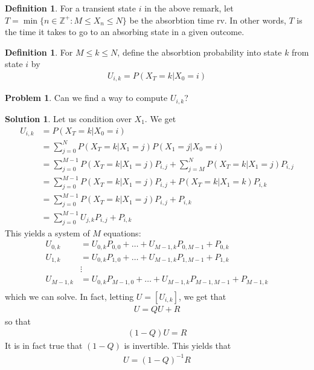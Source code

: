 \documentclass[11pt]{amsart}
\theoremstyle{definition}
\newtheorem{definition}[theorem]{Definition}
\newtheorem{problem}[theorem]{Problem}
\newtheorem{solution}[theorem]{Solution}
\numberwithin{equation}{section}
\begin{document}
 \begin{definition}
     For a transient state $i$ in the above remark, let $T=\min\{n\in\mathbb Z^+:M\le X_n\le N\}$ be the absorbtion time rv. In other words, $T$ is the time it takes to go to an absorbing state in a given outcome.
 \end{definition}
 \begin{definition}
     For $M\le k\le N$, define the absorbtion probability into state $k$ from state $i$ by
     \begin{align*}
         U_{i,k}=P(X_T=k|X_0=i)
     \end{align*}
 \end{definition}
 \begin{problem}
     Can we find a way to compute $U_{i,k}$?
 \end{problem}
 \addtocounter{theorem}{-1}
 \begin{solution}
     Let us condition over $X_1$. We get
     \begin{align*}
         U_{i,k}&=P(X_T=k|X_0=i)\\
         &=\sum_{j=0}^NP(X_T=k|X_1=j)P(X_1=j|X_0=i)\\
         &=\sum_{j=0}^{M-1}P(X_T=k|X_1=j)P_{i,j}+\sum_{j=M}^NP(X_T=k|X_1=j)P_{i,j}\\
         &=\sum_{j=0}^{M-1}P(X_T=k|X_1=j)P_{i,j}+P(X_T=k|X_1=k)P_{i,k}\\
         &=\sum_{j=0}^{M-1}P(X_T=k|X_1=j)P_{i,j}+P_{i,k}\\
         &=\sum_{j=0}^{M-1}U_{j,k}P_{i,j}+P_{i,k}
     \end{align*}
     This yields a system of $M$ equations:
     \begin{align*}
         U_{0,k}&=U_{0,k}P_{0,0}+\ldots+U_{M-1,k}P_{0,M-1}+P_{0,k}\\
         U_{1,k}&=U_{0,k}P_{1,0}+\ldots+U_{M-1,k}P_{1,M-1}+P_{1,k}\\
         &\vdots\\
         U_{M-1,k}&=U_{0,k}P_{M-1,0}+\ldots+U_{M-1,k}P_{M-1,M-1}+P_{M-1,k}\\
     \end{align*}
     which we can solve. In fact, letting $U=[U_{i,k}]$, we get that
     \begin{align*}
         U=QU+R
     \end{align*}
     so that
     \begin{align*}
         (1-Q)U=R
     \end{align*}
     It is in fact true that $(1-Q)$ is invertible. This yields that
     \begin{align*}
         U=(1-Q)^{-1}R
     \end{align*}
 \end{solution}
\end{document}
